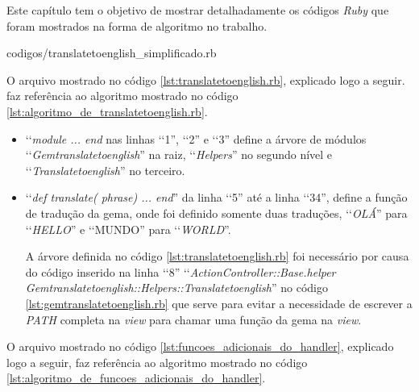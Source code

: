 Este capítulo tem o objetivo de mostrar detalhadamente os códigos \emph{Ruby} que foram mostrados na forma
de algoritmo no trabalho.


{codigos/translatetoenglish_simplificado.rb}

O arquivo mostrado no código \ref{lst:translatetoenglish.rb}, explicado logo a seguir. faz referência
ao algoritmo mostrado no código \ref{lst:algoritmo_de_translatetoenglish.rb}.

\begin{itemize}

  \item ‘‘\emph{module ... end} nas linhas ‘‘1'', ‘‘2'' e ‘‘3'' define a árvore de módulos
  ‘‘\emph{Gemtranslatetoenglish}'' na raiz, ‘‘\emph{Helpers}'' no segundo nível e ‘‘\emph{Translatetoenglish}'' no
  terceiro.

  \item ‘‘\emph{def translate( phrase) ... end}'' da linha ‘‘5'' até a linha ‘‘34'', define
  a função de tradução da gema, onde foi definido somente duas traduções, ‘‘\emph{OLÁ}''
  para ‘‘\emph{HELLO}'' e ‘‘MUNDO'' para ‘‘\emph{WORLD}''.

  A árvore definida no código \ref{lst:translatetoenglish.rb} foi necessário por causa do código
  inserido na linha ‘‘8'' ‘‘\emph{ActionController::Base.helper Gemtranslatetoenglish::Helpers::Translatetoenglish}''
  no código \ref{lst:gemtranslatetoenglish.rb} que serve para evitar a necessidade de escrever a
  \emph{PATH} completa na \emph{view} para chamar uma função da gema na \emph{view}.

\end{itemize}


O arquivo mostrado no código \ref{lst:funcoes_adicionais_do_handler}, explicado logo a seguir, faz
referência ao algoritmo mostrado no código \ref{lst:algoritmo_de_funcoes_adicionais_do_handler}.

